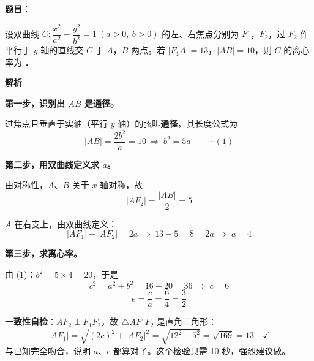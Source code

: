 \begin{answer}

\textbf{题目}：

设双曲线 $C:\dfrac{x^{2}}{a^{2}}-\dfrac{y^{2}}{b^{2}}=1\ (a>0,\ b>0)$ 的左、右焦点分别为 $F_1$，$F_2$，过 $F_2$ 作平行于 $y$ 轴的直线交 $C$ 于 $A$，$B$ 两点。若 $|F_1A|=13$，$|AB|=10$，则 $C$ 的离心率为 \gkblank{}．

\textbf{解析}

\textbf{第一步，识别出 $AB$ 是通径。}

过焦点且垂直于实轴（平行 $y$ 轴）的弦叫\textbf{通径}，其长度公式为
\nopagebreak[4]
\[|AB|=\frac{2b^{2}}{a}=10\ \Longrightarrow\ b^{2}=5a\qquad\cdots(1)\]

\textbf{第二步，用双曲线定义求 $a$。}

由对称性，$A$、$B$ 关于 $x$ 轴对称，故
\nopagebreak[4]
\[\left|AF_2\right|=\frac{|AB|}2=5\]

$A$ 在右支上，由双曲线定义：
\nopagebreak[4]
\[\left|AF_1\right|-\left|AF_2\right|=2a\ \Longrightarrow\ 13-5=8=2a\ \Longrightarrow\ a=4\]

\textbf{第三步，求离心率。}

由 (1)：$b^{2}=5\times4=20$，于是
\nopagebreak[4]
\[c^{2}=a^{2}+b^{2}=16+20=36\ \Longrightarrow\ c=6\]
\nopagebreak[4]
\[e=\frac ca=\frac64=\frac32\]

\begin{gktip}
\textbf{一致性自检}：$AF_2\perp F_1F_2$，故 $\triangle AF_1F_2$ 是直角三角形：
\nopagebreak[4]
\[\left|AF_1\right|=\sqrt{(2c)^{2}+\left|AF_2\right|^{2}}=\sqrt{12^{2}+5^{2}}=\sqrt{169}=13\quad\checkmark\]
与已知完全吻合，说明 $a$、$c$ 都算对了。这个检验只需 10 秒，强烈建议做。
\end{gktip}


\par\medskip

\end{answer}
